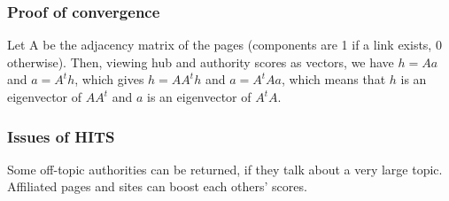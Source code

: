 \subsubsection{Proof of convergence}

Let A be the adjacency matrix of the pages (components are 1 if a link exists, 0 otherwise). Then, viewing hub and authority scores as vectors, we have $h = Aa$ and $a = A^t h$, which gives $h = AA^t h$ and $a = A^t Aa$, which means that $h$ is an eigenvector of $AA^t$ and $a$ is an eigenvector of $A^tA$.

\subsubsection{Issues of HITS}

Some off-topic authorities can be returned, if they talk about a very large topic.
Affiliated pages and sites can boost each others' scores.